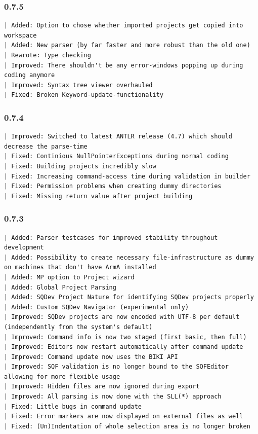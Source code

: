 \documentclass[twoside=false]{scrbook}
\begin{document}
	\subsubsection*{0.7.5}
	\begin{lstlisting}[breaklines=true]
| Added: Option to chose whether imported projects get copied into workspace
| Added: New parser (by far faster and more robust than the old one)
| Rewrote: Type checking
| Improved: There shouldn't be any error-windows popping up during coding anymore
| Improved: Syntax tree viewer overhauled
| Fixed: Broken Keyword-update-functionality
	\end{lstlisting}
	
	\subsubsection*{0.7.4}
	\begin{lstlisting}[breaklines=true]
| Improved: Switched to latest ANTLR release (4.7) which should decrease the parse-time
| Fixed: Continious NullPointerExceptions during normal coding
| Fixed: Building projects incredibly slow
| Fixed: Increasing command-access time during validation in builder
| Fixed: Permission problems when creating dummy directories
| Fixed: Missing return value after project building
	\end{lstlisting}
	
	\subsubsection*{0.7.3}
	\begin{lstlisting}[breaklines=true]
| Added: Parser testcases for improved stability throughout development
| Added: Possibility to create necessary file-infrastructure as dummy on machines that don't have ArmA installed
| Added: MP option to Project wizard
| Added: Global Project Parsing
| Added: SQDev Project Nature for identifying SQDev projects properly
| Added: Custom SQDev Navigator (experimental only)
| Improved: SQDev projects are now encoded with UTF-8 per default (independently from the system's default)
| Improved: Command info is now two staged (first basic, then full)
| Improved: Editors now restart automatically after command update
| Improved: Command update now uses the BIKI API
| Improved: SQF validation is no longer bound to the SQFEditor allowing for more flexible usage
| Improved: Hidden files are now ignored during export
| Improved: All parsing is now done with the SLL(*) approach
| Fixed: Little bugs in command update
| Fixed: Error markers are now displayed on external files as well
| Fixed: (Un)Indentation of whole selection area is no longer broken
	\end{lstlisting}
	
\end{document}
